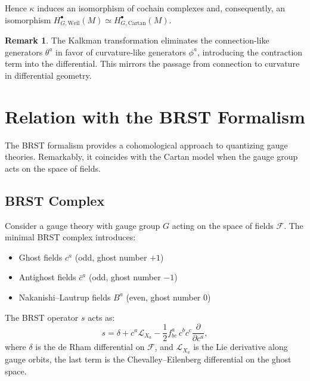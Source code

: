 \documentclass[10pt]{article}
\theoremstyle{definition}
\newtheorem{remark}[definition]{Remark}
\newcommand{\lie}[1]{\mathcal{L}_{#1}}
\begin{document}
Hence $\kappa$ induces an isomorphism of cochain complexes and, consequently, an isomorphism $H^{\bullet}_{G,\text{Weil}}(M) \simeq H^{\bullet}_{G,\text{Cartan}}(M)$.

\begin{remark}
The Kalkman transformation eliminates the connection-like generators $\theta^{a}$ in favor of curvature-like generators $\phi^{a}$, introducing the contraction term into the differential. This mirrors the passage from connection to curvature in differential geometry.
\end{remark}

\section{Relation with the BRST Formalism}\label{sec:brst}
The BRST formalism provides a cohomological approach to quantizing gauge theories. Remarkably, it coincides with the Cartan model when the gauge group acts on the space of fields.

\subsection{BRST Complex}
Consider a gauge theory with gauge group $G$ acting on the space of fields $\mathcal{F}$. The minimal BRST complex introduces:
\begin{itemize}
    \item Ghost fields $c^a$ (odd, ghost number $+1$)
    \item Antighost fields $\bar{c}^a$ (odd, ghost number $-1$)
    \item Nakanishi--Lautrup fields $B^a$ (even, ghost number $0$)
\end{itemize}
The BRST operator $s$ acts as:
\begin{equation}\label{eq:brst-operator}
    s = \delta + c^{a} \lie{X_{a}} - \frac{1}{2} f^{a}_{bc}\, c^{b}c^{c} \frac{\partial}{\partial c^{a}},
\end{equation}
where $\delta$ is the de Rham differential on $\mathcal{F}$, and $\lie{X_a}$ is the Lie derivative along gauge orbits, the last term is the Chevalley--Eilenberg differential on the ghost space.
\end{document}
